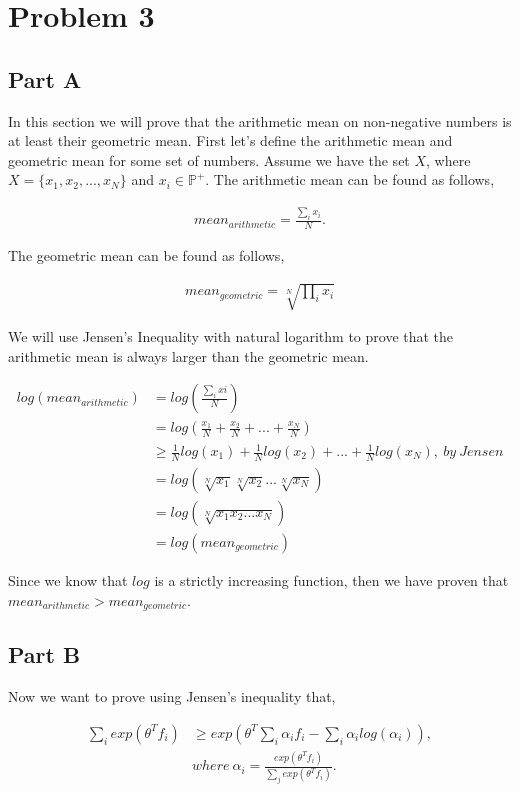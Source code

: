 \documentclass[paper=a4, fontsize=11pt]{scrartcl} %
\begin{document}
\section{Problem 3}

\subsection{Part A}
In this section we will prove that the arithmetic mean on non-negative numbers is at least their geometric mean.
First let's define the arithmetic mean and geometric mean for some set of numbers.  
Assume we have the set $X$, where $X = \{x_1,x_2,...,x_N\} $ and $ x_i \in \mathbb{P}^+$.
The arithmetic mean can be found as follows, 

\begin{align}
mean_{arithmetic} = \frac{\sum_i x_i}{N}.
\end{align}

The geometric mean can be found as follows,

\begin{align}
mean_{geometric} = \sqrt[N]{\prod_i x_i}
\end{align}

We will use Jensen's Inequality with natural logarithm to prove that the arithmetic mean is always larger than the geometric mean.

\begin{align}
log(mean_{arithmetic}) &= log(\frac{\sum_i xi}{N}) \\
&= log(\frac{x_1}{N}+\frac{x_2}{N}+...+\frac{x_N}{N}) \\
&\ge \frac{1}{N}log(x_1)+\frac{1}{N}log(x_2)+...+\frac{1}{N}log(x_N), \ by \  Jensen \\
&= log(\sqrt[N]{x_1}\sqrt[N]{x_2}...\sqrt[N]{x_N}) \\
&=log(\sqrt[N]{x_1x_2...x_N}) \\
&= log(mean_{geometric})
\end{align}

Since we know that $log$ is a strictly increasing function, then we have proven that $ mean_{arithmetic} > mean_{geometric}$.

\subsection{Part B}
Now we want to prove using Jensen's inequality that, 

\begin{align}
\sum_i exp(\theta^Tf_i) &\ge exp( \theta^T \sum_i \alpha_if_i - \sum_i \alpha_i log(\alpha_i)), \\
&where\   \alpha_i = \frac{ exp(\theta^Tf_i)}{\sum_j  exp(\theta^Tf_i)}.
\end{align}
\end{document}
